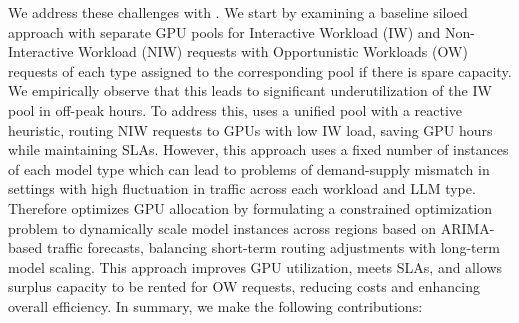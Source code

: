 We address these challenges with \sys. We start by examining a baseline siloed approach with separate GPU pools for Interactive Workload (IW) and Non-Interactive Workload (NIW) requests with Opportunistic Workloads (OW) requests of each type assigned to the corresponding pool if there is spare capacity. %
We empirically observe that this leads to significant underutilization of the IW pool in off-peak hours. To address this, \sys uses a unified pool with a reactive heuristic, routing NIW requests to GPUs with low IW load, saving GPU hours while maintaining SLAs. However, this approach uses a fixed number of instances of each model type which can lead to problems of demand-supply mismatch in settings with high fluctuation in traffic across each workload and LLM type. %
Therefore \sys optimizes GPU allocation by formulating a constrained optimization problem to dynamically scale model instances across regions based on ARIMA-based traffic forecasts, balancing short-term routing adjustments with long-term model scaling. This approach improves GPU utilization, meets SLAs, and allows surplus capacity to be rented for OW requests, reducing costs and enhancing overall efficiency.
In summary, we make the following contributions: 
